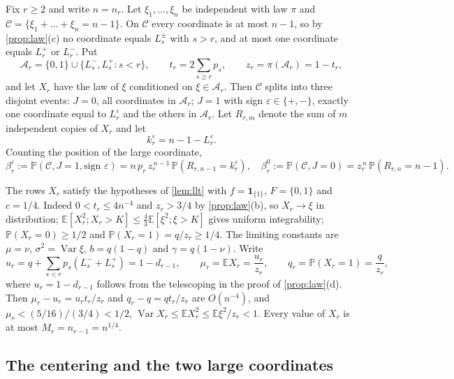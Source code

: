 \documentclass[11pt]{amsart}
\theoremstyle{definition}
\newcommand{\E}{\mathbb{E}}
\newcommand{\Prob}{\mathbb{P}}
\newcommand{\Cond}{\mathcal{C}}
\newcommand{\Ind}{\mathbf{1}}
\DeclareMathOperator{\Var}{Var}
\begin{document}
Fix $r\ge2$ and write $n=n_r$. Let $\xi_1,\dots,\xi_n$ be independent with law $\pi$ and $\Cond=\{\xi_1+\dots+\xi_n=n-1\}$. On $\Cond$ every coordinate is at most $n-1$, so by \cref{prop:law}(c) no coordinate equals $L_s^\pm$ with $s>r$, and at most one coordinate equals $L_r^+$ or $L_r^-$. Put
\[
\mathcal A_r=\{0,1\}\cup\{L_s^-,L_s^+:s<r\},\qquad t_r=2\sum_{s\ge r}p_s,\qquad z_r=\pi(\mathcal A_r)=1-t_r,
\]
and let $X_r$ have the law of $\xi$ conditioned on $\xi\in\mathcal A_r$. Then $\Cond$ splits into three disjoint events: $J=0$, all coordinates in $\mathcal A_r$; $J=1$ with sign $\varepsilon\in\{+,-\}$, exactly one coordinate equal to $L_r^\varepsilon$ and the others in $\mathcal A_r$. Let $R_{r,m}$ denote the sum of $m$ independent copies of $X_r$ and let
\[
k_r^\varepsilon=n-1-L_r^\varepsilon .
\]
Counting the position of the large coordinate,
\begin{equation}\label{eq:beta}
\beta_r^\varepsilon:=\Prob(\Cond,J=1,\text{sign }\varepsilon)=n\,p_r\,z_r^{\,n-1}\,\Prob(R_{r,n-1}=k_r^\varepsilon),
\quad
\beta_r^0:=\Prob(\Cond,J=0)=z_r^{\,n}\,\Prob(R_{r,n}=n-1).
\end{equation}

The rows $X_r$ satisfy the hypotheses of \cref{lem:llt} with $f=\Ind_{\{1\}}$, $F=\{0,1\}$ and $c=1/4$. Indeed $0<t_r\le4n^{-4}$ and $z_r>3/4$ by \cref{prop:law}(b), so $X_r\to\xi$ in distribution; $\E[X_r^2;X_r>K]\le\tfrac43\E[\xi^2;\xi>K]$ gives uniform integrability; $\Prob(X_r=0)\ge1/2$ and $\Prob(X_r=1)=q/z_r\ge1/4$. The limiting constants are $\mu=\nu$, $\sigma^2=\Var\xi$, $b=q(1-q)$ and $\gamma=q(1-\nu)$. Write
\begin{equation}\label{eq:rowmeans}
u_r=q+\sum_{s<r}p_s(L_s^-+L_s^+)=1-d_{r-1},\qquad
\mu_r=\E X_r=\frac{u_r}{z_r},\qquad
q_r=\Prob(X_r=1)=\frac q{z_r},
\end{equation}
where $u_r=1-d_{r-1}$ follows from the telescoping in the proof of \cref{prop:law}(d). Then $\mu_r-u_r=u_rt_r/z_r$ and $q_r-q=qt_r/z_r$ are $O(n^{-4})$, and $\mu_r<(5/16)/(3/4)<1/2$, $\Var X_r\le\E X_r^2\le\E\xi^2/z_r<1$. Every value of $X_r$ is at most $M_r=n_{r-1}=n^{1/4}$.

\subsection{The centering and the two large coordinates}
\end{document}
